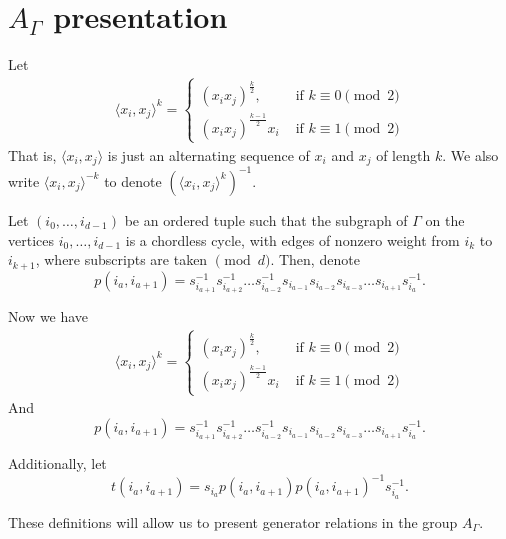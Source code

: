 \documentclass{beamer}
\begin{document}
\section{$A_{\Gamma}$ presentation}

\begin{frame}
\begin{block}

Let
\begin{align*}
\langle x_i,x_j \rangle ^k = \begin{cases}
(x_ix_j)^{\frac{k}{2}}, &\text{ if }k \equiv 0 \pmod 2\\
(x_ix_j)^{\frac{k-1}{2}}x_i &\text{ if } k \equiv 1 \pmod 2
\end{cases}
\end{align*}
That is, $\langle x_i,x_j \rangle$ is just an alternating sequence of $x_i$ and $x_j$ of length $k$.  We also write $\langle x_i,x_j\rangle^{-k}$ to denote $\left(\langle x_i,x_j\rangle^k\right)^{-1}$.
\end{block}

\begin{block}

Let $(i_0,\ldots, i_{d-1})$ be an ordered tuple such that the subgraph of $\Gamma$ on the vertices $i_0,\ldots, i_{d-1}$ is a chordless cycle, with edges of nonzero weight from $i_k$ to $i_{k+1}$, where subscripts are taken $\pmod d.$ Then, denote $$p(i_a,i_{a+1}) = s_{i_{a+1}}^{-1}s_{i_{a+2}}^{-1}\dots s_{i_{a-2}}^{-1}s_{i_{a-1}}s_{i_{a-2}}s_{i_{a-3}}\dots s_{i_{a+1}} s_{i_{a}}^{-1}.$$
\end{block}

\end{frame}
\begin{frame}
Now we have 
\begin{align*}
\langle x_i,x_j \rangle ^k = \begin{cases}
(x_ix_j)^{\frac{k}{2}}, &\text{ if }k \equiv 0 \pmod 2\\
(x_ix_j)^{\frac{k-1}{2}}x_i &\text{ if } k \equiv 1 \pmod 2
\end{cases}
\end{align*}
And $$p(i_a,i_{a+1}) = s_{i_{a+1}}^{-1}s_{i_{a+2}}^{-1}\dots s_{i_{a-2}}^{-1}s_{i_{a-1}}s_{i_{a-2}}s_{i_{a-3}}\dots s_{i_{a+1}} s_{i_{a}}^{-1}.$$

Additionally, let $$t(i_a,i_{a+1}) = s_{i_a} p(i_a,i_{a+1}) p(i_a,i_{a+1})^{-1} s_{i_a}^{-1}.$$

These definitions will allow us to present generator relations in the group $A_{\Gamma}$.

\end{frame}
\end{document}

